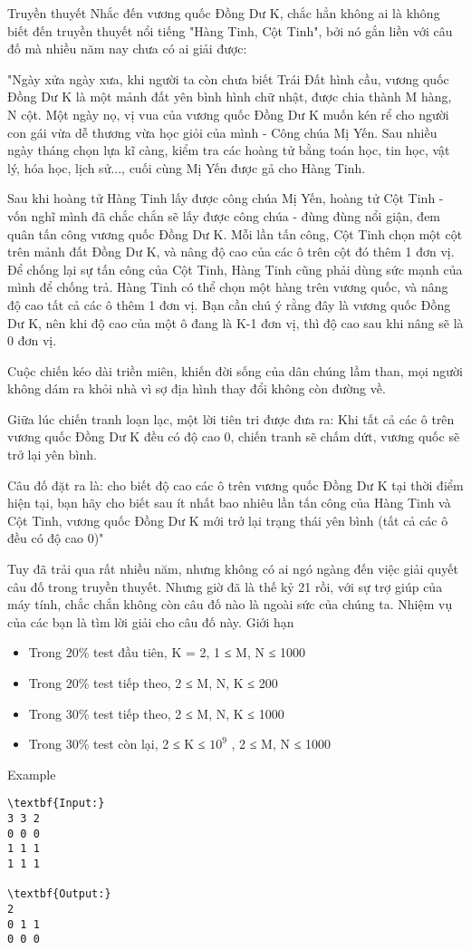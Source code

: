 Truyền thuyết
Nhắc đến vương quốc Đồng Dư K, chắc hẳn không ai là không biết đến truyền thuyết nổi tiếng "Hàng Tinh, Cột Tinh", bởi nó gắn liền với câu đố mà nhiều năm nay chưa có ai giải được:

"Ngày xửa ngày xưa, khi người ta còn chưa biết Trái Đất hình cầu, vương quốc Đồng Dư K là một mảnh đất yên bình hình chữ nhật, được chia thành M hàng, N cột. Một ngày nọ, vị vua của vương quốc Đồng Dư K muốn kén rể cho người con gái vừa dễ thương vừa học giỏi của mình - Công chúa Mị Yến. Sau nhiều ngày tháng chọn lựa kĩ càng, kiểm tra các hoàng tử bằng toán học, tin học, vật lý, hóa học, lịch sử..., cuối cùng Mị Yến được gả cho Hàng Tinh.

Sau khi hoàng tử Hàng Tinh lấy được công chúa Mị Yến, hoàng tử Cột Tinh - vốn nghĩ mình đã chắc chắn sẽ lấy được công chúa - đùng đùng nổi giận, đem quân tấn công vương quốc Đồng Dư K. Mỗi lần tấn công, Cột Tinh chọn một cột trên mảnh đất Đồng Dư K, và nâng độ cao của các ô trên cột đó thêm 1 đơn vị. Để chống lại sự tấn công của Cột Tinh, Hàng Tinh cũng phải dùng sức mạnh của mình để chống trả. Hàng Tinh có thể chọn một hàng trên vương quốc, và nâng độ cao tất cả các ô thêm 1 đơn vị. Bạn cần chú ý rằng đây là vương quốc Đồng Dư K, nên khi độ cao của một ô đang là K-1 đơn vị, thì độ cao sau khi nâng sẽ là 0 đơn vị.

Cuộc chiến kéo dài triền miên, khiến đời sống của dân chúng lầm than, mọi người không dám ra khỏi nhà vì sợ địa hình thay đổi không còn đường về.

Giữa lúc chiến tranh loạn lạc, một lời tiên tri được đưa ra: Khi tất cả các ô trên vương quốc Đồng Dư K đều có độ cao 0, chiến tranh sẽ chấm dứt, vương quốc sẽ trở lại yên bình.

Câu đố đặt ra là: cho biết độ cao các ô trên vương quốc Đồng Dư K tại thời điểm hiện tại, bạn hãy cho biết sau ít nhất bao nhiêu lần tấn công của Hàng Tinh và Cột Tinh, vương quốc Đồng Dư K mới trở lại trạng thái yên bình (tất cả các ô đều có độ cao 0)"

Tuy đã trải qua rất nhiều năm, nhưng không có ai ngó ngàng đến việc giải quyết câu đố trong truyền thuyết. Nhưng giờ đã là thế kỷ 21 rồi, với sự trợ giúp của máy tính, chắc chắn không còn câu đố nào là ngoài sức của chúng ta. Nhiệm vụ của các bạn là tìm lời giải cho câu đố này.
Giới hạn
\begin{itemize}
	\item Trong 20\% test đầu tiên, K = 2, 1 ≤ M, N ≤ 1000
	\item Trong 20\% test tiếp theo, 2 ≤ M, N, K ≤ 200
	\item Trong 30\% test tiếp theo, 2 ≤ M, N, K ≤ 1000
	\item Trong 30\% test còn lại, 2 ≤ K ≤ $10^{9}$ , 2 ≤ M, N ≤ 1000
\end{itemize}
Example
\begin{verbatim}
\textbf{Input:}
3 3 2
0 0 0
1 1 1
1 1 1

\textbf{Output:}
2
0 1 1
0 0 0\end{verbatim}
